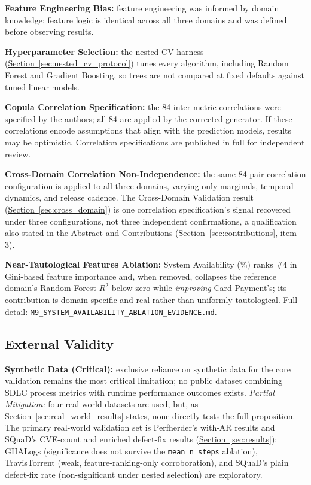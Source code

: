\documentclass[technologies,article,submit,pdftex,moreauthors]{Definitions/mdpi}
\begin{document}
\textbf{Feature Engineering Bias:} feature engineering was informed by domain knowledge; feature logic is identical across all three domains and was defined before observing results.

\textbf{Hyperparameter Selection:} the nested-CV harness (\hyperref[sec:nested_cv_protocol]{Section~\ref*{sec:nested_cv_protocol}}) tunes every algorithm, including Random Forest and Gradient Boosting, so trees are not compared at fixed defaults against tuned linear models.

\textbf{Copula Correlation Specification:} the 84 inter-metric correlations were specified by the authors; all 84 are applied by the corrected generator. If these correlations encode assumptions that align with the prediction models, results may be optimistic. Correlation specifications are published in full for independent review.

\textbf{Cross-Domain Correlation Non-Independence:} the same 84-pair correlation configuration is applied to all three domains, varying only marginals, temporal dynamics, and release cadence. The Cross-Domain Validation result (\hyperref[sec:cross_domain]{Section~\ref*{sec:cross_domain}}) is one correlation specification's signal recovered under three configurations, not three independent confirmations, a qualification also stated in the Abstract and Contributions (\hyperref[sec:contributions]{Section~\ref*{sec:contributions}}, item 3).

\textbf{Near-Tautological Features Ablation:} System Availability (\%) ranks \#4 in Gini-based feature importance and, when removed, collapses the reference domain's Random Forest \(R^2\) below zero while \emph{improving} Card Payment's; its contribution is domain-specific and real rather than uniformly tautological. Full detail: \texttt{M9\_SYSTEM\_AVAILABILITY\_ABLATION\_EVIDENCE.md}.

\subsection{External Validity}\label{sec:external_validity}

\textbf{Synthetic Data (Critical):} exclusive reliance on synthetic data for the core validation remains the most critical limitation; no public dataset combining SDLC process metrics with runtime performance outcomes exists. \emph{Partial Mitigation:} four real-world datasets are used, but, as \hyperref[sec:real_world_results]{Section~\ref*{sec:real_world_results}} states, none directly tests the full proposition. The primary real-world validation set is Perfherder's with-AR results and SQuaD's CVE-count and enriched defect-fix results (\hyperref[sec:results]{Section~\ref*{sec:results}}); GHALogs (significance does not survive the \texttt{mean\_n\_steps} ablation), TravisTorrent (weak, feature-ranking-only corroboration), and SQuaD's plain defect-fix rate (non-significant under nested selection) are exploratory.
\end{document}

